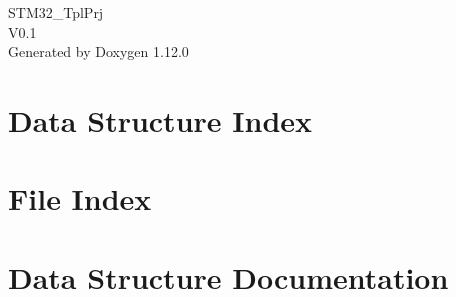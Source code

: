 \documentclass[twoside]{book}
\newcommand{\+}{\discretionary{\mbox{\scriptsize$\hookleftarrow$}}{}{}}
\newcommand{\clearemptydoublepage}{%
    \newpage{\pagestyle{empty}\cleardoublepage}%
  }
\begin{document}
  \raggedbottom
    \hypersetup{pageanchor=false,
                bookmarksnumbered=true,
                pdfencoding=unicode
               }
  \begin{titlepage}
  \vspace*{7cm}
  \begin{center}%
  {\Large STM32\+\_\+\+Tpl\+Prj}\\
  [1ex]\large V0.\+1 \\
  \vspace*{1cm}
  {\large Generated by Doxygen 1.12.0}\\
  \end{center}
  \end{titlepage}
  \clearemptydoublepage
  \tableofcontents
  \clearemptydoublepage
  \hypersetup{pageanchor=true}
\chapter{Data Structure Index}

\chapter{File Index}

\chapter{Data Structure Documentation}





















\end{document}
